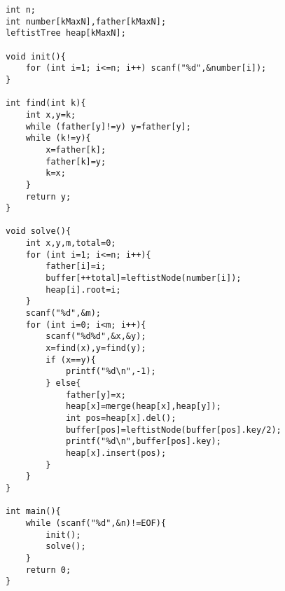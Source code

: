 \begin{verbatim}
int n;
int number[kMaxN],father[kMaxN];
leftistTree heap[kMaxN];

void init(){
    for (int i=1; i<=n; i++) scanf("%d",&number[i]);
}

int find(int k){
    int x,y=k;
    while (father[y]!=y) y=father[y];
    while (k!=y){
        x=father[k];
        father[k]=y;
        k=x;
    }
    return y;
}

void solve(){
    int x,y,m,total=0;
    for (int i=1; i<=n; i++){
        father[i]=i;
        buffer[++total]=leftistNode(number[i]);
        heap[i].root=i;
    }
    scanf("%d",&m);
    for (int i=0; i<m; i++){
        scanf("%d%d",&x,&y);
        x=find(x),y=find(y);
        if (x==y){
            printf("%d\n",-1);
        } else{
            father[y]=x;
            heap[x]=merge(heap[x],heap[y]);
            int pos=heap[x].del();
            buffer[pos]=leftistNode(buffer[pos].key/2);
            printf("%d\n",buffer[pos].key);
            heap[x].insert(pos);
        }
    }
}

int main(){
    while (scanf("%d",&n)!=EOF){
        init();
        solve();
    }
    return 0;
}


\end{verbatim}

